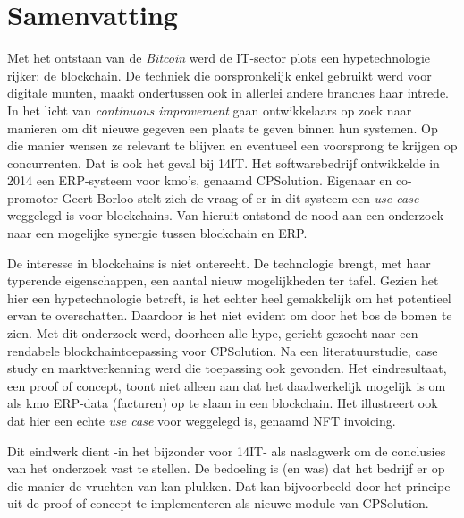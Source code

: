 
%
%
%


\chapter*{Samenvatting}

Met het ontstaan van de \textit{Bitcoin} werd de IT-sector plots een hypetechnologie rijker: de blockchain. De techniek die oorspronkelijk enkel gebruikt werd voor digitale munten, maakt ondertussen ook in allerlei andere branches haar intrede. In het licht van \textit{continuous improvement} gaan ontwikkelaars op zoek naar manieren om dit nieuwe gegeven een plaats te geven binnen hun systemen. Op die manier wensen ze relevant te blijven en eventueel een voorsprong te krijgen op concurrenten. Dat is ook het geval bij 14IT. Het softwarebedrijf ontwikkelde in 2014 een ERP-systeem voor kmo's, genaamd CPSolution. Eigenaar en co-promotor Geert Borloo stelt zich de vraag of er in dit systeem een \textit{use case} weggelegd is voor blockchains. Van hieruit ontstond de nood aan een onderzoek naar een mogelijke synergie tussen blockchain en ERP.

De interesse in blockchains is niet onterecht. De technologie brengt, met haar typerende eigenschappen, een aantal nieuw mogelijkheden ter tafel. Gezien het hier een hypetechnologie betreft, is het echter heel gemakkelijk om het potentieel ervan te overschatten. Daardoor is het niet evident om door het bos de bomen te zien. Met dit onderzoek werd, doorheen alle hype, gericht gezocht naar een rendabele blockchaintoepassing voor CPSolution. Na een literatuurstudie, case study en marktverkenning werd die toepassing ook gevonden. Het eindresultaat, een proof of concept, toont niet alleen aan dat het daadwerkelijk mogelijk is om als kmo ERP-data (facturen) op te slaan in een blockchain. Het illustreert ook dat hier een echte \textit{use case} voor weggelegd is, genaamd NFT invoicing.

Dit eindwerk dient -in het bijzonder voor 14IT- als naslagwerk om de conclusies van het onderzoek vast te stellen. De bedoeling is (en was) dat het bedrijf er op die manier de vruchten van kan plukken. Dat kan bijvoorbeeld door het principe uit de proof of concept te implementeren als nieuwe module van CPSolution.

